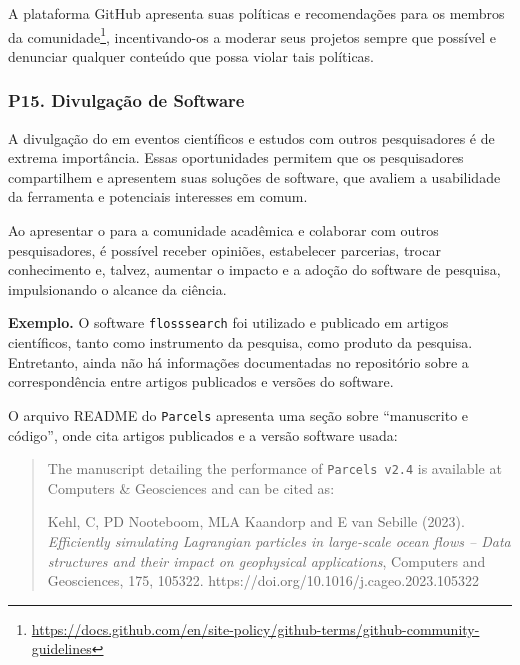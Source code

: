 A plataforma GitHub apresenta suas políticas e recomendações para os membros da comunidade\footnote{\url{https://docs.github.com/en/site-policy/github-terms/github-community-guidelines}}, incentivando-os a
moderar seus projetos sempre que possível e denunciar qualquer conteúdo que possa violar tais políticas.

\subsubsection*{P15. Divulgação de Software} 


A divulgação do \RSw em eventos científicos e estudos com outros pesquisadores é de extrema importância. Essas oportunidades permitem que os pesquisadores compartilhem e apresentem suas soluções de software, que avaliem a usabilidade da ferramenta e potenciais interesses em comum.
 
Ao apresentar o \RSw para a comunidade acadêmica e colaborar com outros pesquisadores, é possível receber opiniões, estabelecer parcerias, trocar conhecimento e, talvez, aumentar o impacto e a adoção do software de pesquisa, impulsionando o alcance da ciência.

\noindent \textbf{Exemplo.}
O software \texttt{flosssearch} foi utilizado e publicado em artigos científicos, tanto como instrumento da pesquisa, como produto da pesquisa. Entretanto, ainda não há informações  documentadas no repositório sobre a correspondência entre artigos publicados e versões do software.

O arquivo README do \texttt{Parcels} apresenta uma seção sobre ``manuscrito e código'', onde cita artigos publicados e a versão software usada:
\begin{quote}
The manuscript detailing the performance of \texttt{Parcels v2.4} is available at Computers \& Geosciences and can be cited as:

Kehl, C, PD Nooteboom, MLA Kaandorp and E van Sebille (2023).
\textit{Efficiently simulating Lagrangian particles in large-scale ocean flows -- Data structures and their impact on geophysical applications}, Computers and Geosciences, 175, 105322. 
https://doi.org/10.1016/j.cageo.2023.105322
\end{quote}

